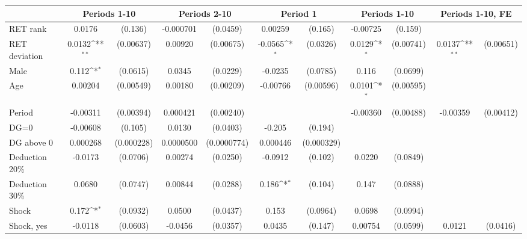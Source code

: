 {
\def\sym#1{\ifmmode^{#1}\else\(^{#1}\)\fi}
\begin{tabular}{l*{5}{cc}}
\hline\hline
                &\multicolumn{2}{c}{Periods 1-10}&\multicolumn{2}{c}{Periods 2-10}&\multicolumn{2}{c}{Period 1}&\multicolumn{2}{c}{Periods 1-10}&\multicolumn{2}{c}{Periods 1-10, FE}\\
\hline
RET rank        &   0.0176         &  (0.136)&-0.000701         & (0.0459)&  0.00259         &  (0.165)& -0.00725         &  (0.159)&                  &         \\
RET deviation   &   0.0132\sym{**} &(0.00637)&  0.00920         &(0.00675)&  -0.0565\sym{*}  & (0.0326)&   0.0129\sym{*}  &(0.00741)&   0.0137\sym{**} &(0.00651)\\
Male            &    0.112\sym{*}  & (0.0615)&   0.0345         & (0.0229)&  -0.0235         & (0.0785)&    0.116         & (0.0699)&                  &         \\
Age             &  0.00204         &(0.00549)&  0.00180         &(0.00209)& -0.00766         &(0.00596)&   0.0101\sym{*}  &(0.00595)&                  &         \\
Period          & -0.00311         &(0.00394)& 0.000421         &(0.00240)&                  &         & -0.00360         &(0.00488)& -0.00359         &(0.00412)\\
DG=0            & -0.00608         &  (0.105)&   0.0130         & (0.0403)&   -0.205         &  (0.194)&                  &         &                  &         \\
DG above 0      & 0.000268         &(0.000228)&0.0000500         &(0.0000774)& 0.000446         &(0.000329)&                  &         &                  &         \\
Deduction 20\%  &  -0.0173         & (0.0706)&  0.00274         & (0.0250)&  -0.0912         &  (0.102)&   0.0220         & (0.0849)&                  &         \\
Deduction 30\%  &   0.0680         & (0.0747)&  0.00844         & (0.0288)&    0.186\sym{*}  &  (0.104)&    0.147         & (0.0888)&                  &         \\
Shock           &    0.172\sym{*}  & (0.0932)&   0.0500         & (0.0437)&    0.153         & (0.0964)&   0.0698         & (0.0994)&                  &         \\
Shock, yes      &  -0.0118         & (0.0603)&  -0.0456         & (0.0357)&   0.0435         &  (0.147)&  0.00754         & (0.0599)&   0.0121         & (0.0416)\\

\end{tabular}}
